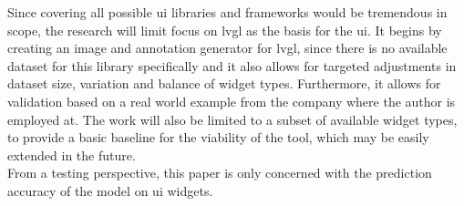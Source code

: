 \documentclass[Bachelor, BIC, english, fhCitStyle, IEEE]{BASE/twbook} %
\begin{document}
Since covering all possible \ac{ui} libraries and frameworks would be tremendous in scope, the research will limit focus on \ac{lvgl} as the basis for the \ac{ui}. It begins by creating an image and annotation generator for \ac{lvgl}, since there is no available dataset for this library specifically and it also allows for targeted adjustments in dataset size, variation and balance of widget types. Furthermore, it allows for validation based on a real world example from the company where the author is employed at. The work will also be limited to a subset of available widget types, to provide a basic baseline for the viability of the tool, which may be easily extended in the future.\\
From a testing perspective, this paper is only concerned with the prediction accuracy of the model on \ac{ui} widgets.
\clearpage
\end{document}
